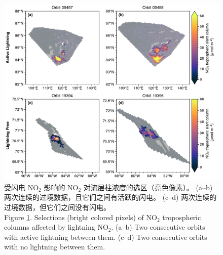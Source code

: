 \begin{figure}[!htbp]
\centering
\includegraphics[width=13cm]{./figures/arctic_consecutive_orbits.pdf}
\caption{
受闪电 NO$_2$ 影响的 NO$_2$ 对流层柱浓度的选区（亮色像素）。
(a--b) 两次连续的过境数据，且它们之间有活跃的闪电。
(c--d) 两次连续的过境数据，但它们之间没有闪电。\\
Figure \ref{fig:consecutive_orbits}. Selections (bright colored pixels) of NO$_2$ tropospheric columns affected by lightning NO$_2$.
(a--b) Two consecutive orbits with active lightning between them.
(c--d) Two consecutive orbits with no lightning between them.
}
\label{fig:consecutive_orbits}
\end{figure}



